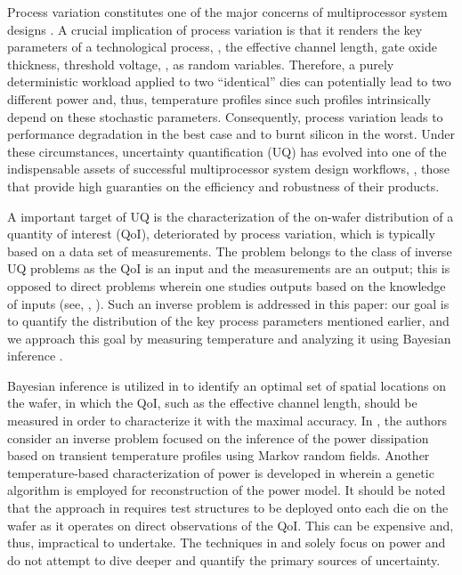 Process variation constitutes one of the major concerns of multiprocessor system designs \cite{srivastava2010}. A crucial implication of process variation is that it renders the key parameters of a technological process, \eg, the effective channel length, gate oxide thickness, threshold voltage, \etc, as random variables.
Therefore, a purely deterministic workload applied to two ``identical'' dies can potentially lead to two different power and, thus, temperature profiles since such profiles intrinsically depend on these stochastic parameters. Consequently, process variation leads to performance degradation in the best case and to burnt silicon in the worst.
Under these circumstances, uncertainty quantification (UQ) has evolved into one of the indispensable assets of successful multiprocessor system design workflows, \ie, those that provide high guaranties on the efficiency and robustness of their products.

A important target of UQ is the characterization of the on-wafer distribution of a quantity of interest (QoI), deteriorated by process variation, which is typically based on a data set of measurements. The problem belongs to the class of inverse UQ problems as the QoI is an input and the measurements are an output; this is opposed to direct problems wherein one studies outputs based on the knowledge of inputs (see, \eg, \cite{juan2011, juan2012}).
Such an inverse problem is addressed in this paper: our goal is to quantify the distribution of the key process parameters mentioned earlier, and we approach this goal by measuring temperature and analyzing it using Bayesian inference \cite{gelman2004}.

Bayesian inference is utilized in \cite{zhang2010} to identify an optimal set of spatial locations on the wafer, in which the QoI, such as the effective channel length, should be measured in order to characterize it with the maximal accuracy.
In \cite{paek2012}, the authors consider an inverse problem focused on the inference of the power dissipation based on transient temperature profiles using Markov random fields.
Another temperature-based characterization of power is developed in \cite{mesa-martinez2007} wherein a genetic algorithm is employed for reconstruction of the power model.
It should be noted that the approach in \cite{zhang2010} requires test structures to be deployed onto each die on the wafer as it operates on direct observations of the QoI. This can be expensive and, thus, impractical to undertake. The techniques in \cite{paek2012} and \cite{mesa-martinez2007} solely focus on power and do not attempt to dive deeper and quantify the primary sources of uncertainty.

